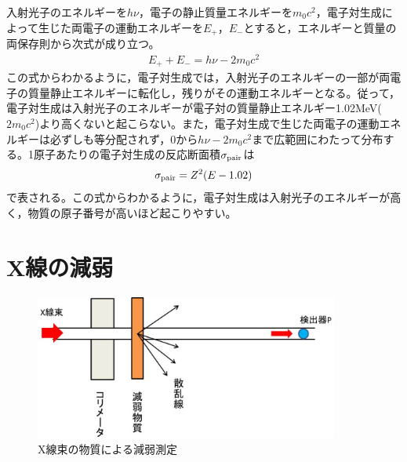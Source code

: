 入射光子のエネルギーを$h\nu$，電子の静止質量エネルギーを$m_0c^2$，電子対生成によって生じた両電子の運動エネルギーを$E_+，E_-$とすると，エネルギーと質量の両保存則から次式が成り立つ。
\begin{align}
E_++E_-=h\nu-2m_0c^2 \label{eq:pair}
\end{align}
この式からわかるように，電子対生成では，入射光子のエネルギーの一部が両電子の質量静止エネルギーに転化し，残りがその運動エネルギーとなる。従って，電子対生成は入射光子のエネルギーが電子対の質量静止エネルギー1.02MeV($2m_0c^2$)より高くないと起こらない。また，電子対生成で生じた両電子の運動エネルギーは必ずしも等分配されず，$0からh\nu-2m_0c^2$まで広範囲にわたって分布する。1原子あたりの電子対生成の反応断面積$\sigma_{\rm pair}$は
\begin{align}
\sigma_{\rm pair}=Z^2(E-1.02) \label{eq:sigma_pair}
\end{align}
で表される。この式からわかるように，電子対生成は入射光子のエネルギーが高く，物質の原子番号が高いほど起こりやすい。

%
\fi

\section{X線の減弱\label{sec:atten}}

\begin{figure}[H]
 \begin{center}
 \includegraphics[width=10cm]{image/other/trans.eps}
 \end{center}
 \vspace{-1cm}
 \caption{X線束の物質による減弱測定}
 \label{fig:trans}
\end{figure}


